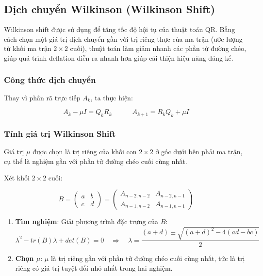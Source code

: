 \subsection{Dịch chuyển Wilkinson (Wilkinson Shift)}

Wilkinson shift được sử dụng để tăng tốc độ hội tụ của thuật toán QR. Bằng cách chọn một giá trị dịch chuyển gần với trị riêng thực của ma trận (ước lượng từ khối ma trận $2 \times 2$ cuối), thuật toán làm giảm nhanh các phần tử đường chéo, giúp quá trình deflation diễn ra nhanh hơn giúp cải thiện hiệu năng đáng kể.

\subsubsection{Công thức dịch chuyển}

Thay vì phân rã trực tiếp $A_k$, ta thực hiện:

\begin{equation}
    A_k - \mu I = Q_k R_k \quad\qquad
    A_{k+1} = R_k Q_k + \mu I
\end{equation}

\subsubsection{Tính giá trị Wilkinson Shift}

Giá trị $\mu$ được chọn là trị riêng của khối con $2 \times 2$ ở góc dưới bên phải ma trận, cụ thể là nghiệm gần với phần tử đường chéo cuối cùng nhất.

Xét khối $2 \times 2$ cuối:

\begin{equation*}
    B = \begin{pmatrix}
        a & b \\
        c & d
    \end{pmatrix} = 
    \begin{pmatrix}
        A_{n-2,n-2} & A_{n-2,n-1} \\
        A_{n-1,n-2} & A_{n-1,n-1}
    \end{pmatrix}
\end{equation*}

\begin{enumerate}[topsep=0pt, itemsep=2.5pt, leftmargin=1.5cm]
    \item \textbf{Tìm nghiệm}: Giải phương trình đặc trưng của $B$:
    \begin{equation*}
        \lambda^2 - tr(B)\lambda + det(B) = 0
        \quad \Rightarrow \quad
        \lambda = \frac{(a + d) \pm \sqrt{(a + d)^2 - 4(ad - bc)}}{2}
    \end{equation*}
    
    \item \textbf{Chọn $\mu$}: $\mu$ là trị riêng gần với phần tử đường chéo cuối cùng nhất, tức là trị riêng có giá trị tuyệt đối nhỏ nhất trong hai nghiệm.
\end{enumerate}

